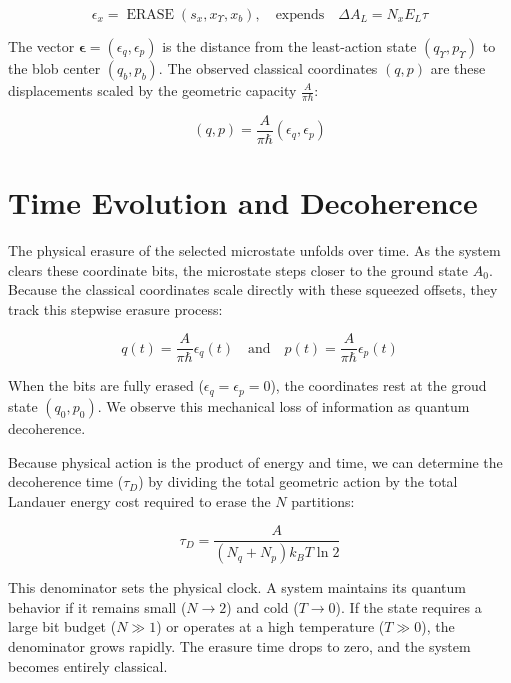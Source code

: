 \documentclass[%
  aps, reprint, prl, amsmath,amssymb
]{revtex4-2}
\begin{document}
\begin{equation}
\label{eq:ErasureFunction}
\epsilon_x = \operatorname{ERASE}(s_x, x_\Upsilon, x_b), \quad \text{expends} \quad \Delta A_L = N_x E_L \tau
\end{equation}

The vector $\mathbf{\epsilon} = (\epsilon_q,\epsilon_p)$ is the distance from the least-action state $(q_\Upsilon, p_\Upsilon)$ to the blob center $(q_b, p_b)$. The observed classical coordinates $(q,p)$ are these displacements scaled by the geometric capacity $\frac{A}{\pi \hbar}$:

\begin{equation}
\label{eq:ObservedCoordinates}
(q,p) = \frac{A}{\pi \hbar} (\epsilon_q,\epsilon_p)
\end{equation}

\section{Time Evolution and Decoherence}

The physical erasure of the selected microstate unfolds over time. As the system clears these coordinate bits, the microstate steps closer to the ground state $A_0$. Because the classical coordinates scale directly with these squeezed offsets, they track this stepwise erasure process:

\begin{equation}
\label{eq:TimeEvolutionCoordinates}
q(t) = \frac{A}{\pi \hbar} \epsilon_q(t) \quad \text{and} \quad p(t) = \frac{A}{\pi \hbar} \epsilon_p(t)
\end{equation}

When the bits are fully erased ($\epsilon_q = \epsilon_p = 0$), the coordinates rest at the groud state $(q_0, p_0)$. We observe this mechanical loss of information as quantum decoherence.

Because physical action is the product of energy and time, we can determine the decoherence time ($\tau_D$) by dividing the total geometric action by the total Landauer energy cost required to erase the $N$ partitions:

\begin{equation}
\label{eq:DecoherenceTime}
\tau_D = \frac{A}{(N_q + N_p) k_B T \ln 2}
\end{equation}

This denominator sets the physical clock. A system maintains its quantum behavior if it remains small ($N \to 2$) and cold ($T \to 0$). If the state requires a large bit budget ($N \gg 1$) or operates at a high temperature ($T \gg 0$), the denominator grows rapidly. The erasure time drops to zero, and the system becomes entirely classical.
\end{document}
